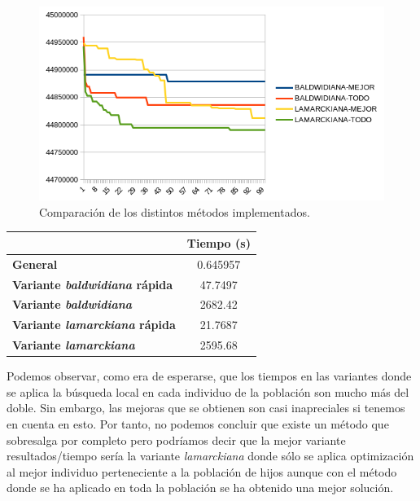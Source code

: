 	\begin{figure}[H]
	\centering
	\includegraphics[scale=0.9]{images/AGcompBL.png} 
	\caption{Comparación de los distintos métodos implementados.}
	\label{perc}
	\end{figure}
	

\begin{table}[H]
\centering
\begin{tabular}{|l|c|}
\hline
                                     & \textbf{Tiempo (s)} \\ \hline
\textbf{General}                     & 0.645957            \\ \hline
\textbf{Variante \textit{baldwidiana} rápida} & 47.7497             \\ \hline
\textbf{Variante \textit{baldwidiana}}        & 2682.42             \\ \hline
\textbf{Variante \textit{lamarckiana} rápida} & 21.7687             \\ \hline
\textbf{Variante \textit{lamarckiana}}        & 2595.68             \\ \hline
\end{tabular}
\end{table}

Podemos observar, como era de esperarse, que los tiempos en las variantes donde se aplica la búsqueda local en cada individuo de la población son mucho más del doble. Sin embargo, las mejoras que se obtienen son casi inapreciales si tenemos en cuenta en esto. Por tanto, no podemos concluir que existe un método que sobresalga por completo pero podríamos decir que la mejor variante resultados/tiempo sería la variante \textit{lamarckiana} donde sólo se aplica optimización al mejor individuo perteneciente a la población de hijos aunque con el método donde se ha aplicado en toda la población se ha obtenido una mejor solución.\\

